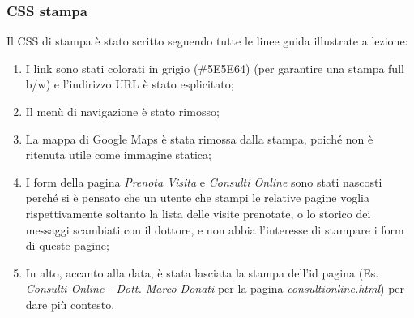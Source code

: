 \begin{center}
\end{center}

\bigskip

\subsubsection{CSS stampa}
Il CSS  di stampa è stato scritto seguendo tutte le linee guida illustrate a lezione:
\begin{enumerate}
\item I link sono stati colorati in grigio (\#5E5E64) (per garantire una stampa full b/w) e l’indirizzo URL è stato esplicitato;
\item Il menù di navigazione è stato rimosso;
\item La mappa di Google Maps è stata rimossa dalla stampa, poiché non è ritenuta utile come immagine statica;
\item I form della pagina \textit{Prenota Visita} e \textit{Consulti Online} sono stati nascosti perché si è pensato che un utente che stampi le relative pagine voglia rispettivamente soltanto la lista delle visite prenotate, o lo storico dei messaggi scambiati con il dottore, e non abbia l'interesse di stampare i form di queste pagine;
\item In alto, accanto alla data, è stata lasciata la stampa dell’id pagina (Es. \textit{Consulti Online - Dott. Marco Donati} per la pagina \textit{consultionline.html}) per dare più contesto.
\end{enumerate}

